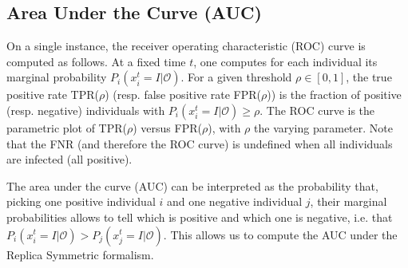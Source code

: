 \documentclass[a4paper, amsfonts, amssymb, amsmath, reprint, showkeys, nofootinbib, twoside, floatfix, pre,superscriptaddress, onecolumn]{revtex4-2}
\begin{document}
\subsection{Area Under the Curve (AUC)}

On a single instance, the receiver operating characteristic (ROC) curve is computed as follows. At a fixed time $t$, one computes for each individual its marginal probability $P_i(x_i^t=I|\mathcal{O})$. For a given threshold $\rho\in[0,1]$, the true positive rate TPR($\rho$) (resp. false positive rate FPR($\rho$)) is the fraction of positive (resp. negative) individuals with $P_i(x_i^t=I|\mathcal{O})\geq \rho$. The ROC curve is the parametric plot of TPR($\rho$) versus FPR($\rho$), with $\rho$ the varying parameter. Note that the FNR (and therefore the ROC curve) is undefined when all individuals are infected (all positive).

The area under the curve (AUC) can be interpreted as the probability that, picking one positive individual $i$ and one negative individual $j$, their marginal probabilities allows to tell which is positive and which one is negative, i.e. that $P_i(x_i^t=I|\mathcal{O}) > P_j(x_j^t=I|\mathcal{O})$.
This allows us to compute the AUC under the Replica Symmetric formalism.


\end{document}
